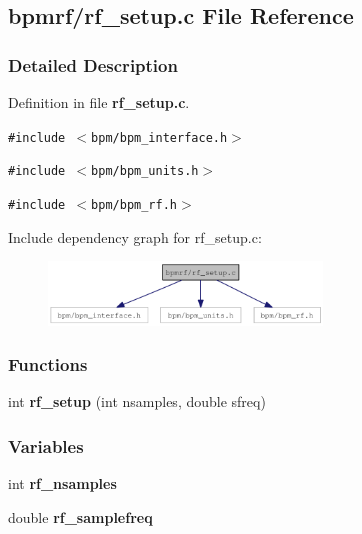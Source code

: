 \subsection{bpmrf/rf\_\-setup.c File Reference}
\label{rf__setup_8c}


\subsubsection{Detailed Description}


Definition in file {\bf rf\_\-setup.c}.

{\tt \#include $<$bpm/bpm\_\-interface.h$>$}\par
{\tt \#include $<$bpm/bpm\_\-units.h$>$}\par
{\tt \#include $<$bpm/bpm\_\-rf.h$>$}\par


Include dependency graph for rf\_\-setup.c:\nopagebreak
\begin{figure}[H]
\begin{center}
\leavevmode
\includegraphics[width=206pt]{rf__setup_8c__incl}
\end{center}
\end{figure}
\subsubsection*{Functions}
\begin{CompactItemize}
\item 
int {\bf rf\_\-setup} (int nsamples, double sfreq)
\end{CompactItemize}
\subsubsection*{Variables}
\begin{CompactItemize}
\item 
int \textbf{rf\_\-nsamples}\label{rf__setup_8c_46c1f23b1ab68c3a3929ab24ab86aed1}

\item 
double \textbf{rf\_\-samplefreq}\label{rf__setup_8c_f80017f9af2204a69a6758bcdf529fd7}

\end{CompactItemize}
